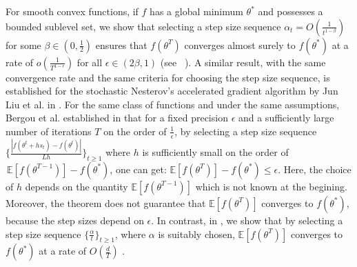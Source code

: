 \documentclass{article} %
\begin{document}
For smooth convex functions, if $f$ has a global minimum $\theta^{*}$ and possesses a bounded sublevel set, we show that selecting a step size sequence $\alpha_t=O(\frac{1}{t^{1-\beta}})$ for some $\beta \in (0 ,\frac{1}{2})$ ensures that $f(\theta^T)$ converges almost surely to $ f(\theta^{*})$ at a rate of $o(\frac{1}{T^{1-\epsilon}})$ for all $\epsilon \in (2\beta,1)$ (see ~). A similar result, with the same convergence rate and the same criteria for choosing the step size sequence, is established for the stochastic Nesterov's accelerated gradient algorithm by Jun Liu et al. in \cite[Theorem 3]{liu2022almost}. For the same class of functions and under the same assumptions, Bergou et al. established in \cite[Theorem 5.5]{bergou2020stochastic} that for a fixed precision $\epsilon$ and a sufficiently large number of iterations $T$ on the order of $\frac{1}{\epsilon}$, by selecting a step size sequence $\{\frac{|f(\theta^t+hs_t )-f(\theta^t)|}{Lh} \}_{t \ge 1}$ where $h$ is sufficiently small on the order of $\frac{}{}\mathbb{E}[f(\theta^{T-1})]- f(\theta^{*})$,  one can get: $\mathbb{E}[f(\theta^{T})]-f(\theta^{*}) \le \epsilon$. 
Here, the choice of $h$ depends on the quantity $\mathbb{E}[f(\theta^{T-1})]$ which is not known at the begining.
Moreover, the theorem does not guarantee that $\mathbb{E}[f(\theta^T)]$ converges to $f(\theta^{*})$, because the step sizes depend on $\epsilon$. In contrast, in , we show that by selecting a step size sequence $\{\frac{\alpha}{t}\}_{t \ge 1}$, where $\alpha$ is suitably chosen, $\mathbb{E}[f(\theta^T)]$ converges to $f(\theta^{*})$ at a rate of $O(\frac{d}{T})$  . 
\end{document}
